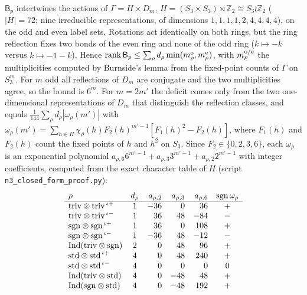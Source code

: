 \documentclass[aps,prx,reprint,superscriptaddress,nobibnotes,longbibliography]{revtex4-2}
\theoremstyle{remark}
\newcommand{\rk}{\operatorname{rank}}
\begin{document}
$\mathsf B_p$ intertwines the actions of $\Gamma=H\times D_m$, $H=(S_3\times S_3)\rtimes\mathbb Z_2\cong S_3\wr\mathbb Z_2$ ($|H|=72$; nine irreducible representations, of dimensions $1,1,1,1,2,4,4,4,4$), on the odd and even label sets.  Rotations act identically on both rings, but the ring reflection fixes two bonds of the even ring and none of the odd ring ($k\mapsto-k$ versus $k\mapsto-1-k$).  Hence $\rk\mathsf B_p\le\sum_\rho d_\rho\min(m_\rho^{\rm o},m_\rho^{\rm e})$, with $m^{\rm o/e}_\rho$ the multiplicities computed by Burnside's lemma from the fixed-point counts of $\Gamma$ on $S_3^m$.  For $m$ odd all reflections of $D_m$ are conjugate and the two multiplicities agree, so the bound is $6^m$.  For $m=2m'$ the deficit comes only from the two one-dimensional representations of $D_m$ that distinguish the reflection classes, and equals $\frac1{144}\sum_\rho d_\rho|\omega_\rho(m')|$ with $\omega_\rho(m')=\sum_{h\in H}\chi_\rho(h)F_2(h)^{m'-1}[F_1(h)^2-F_2(h)]$, where $F_1(h)$ and $F_2(h)$ count the fixed points of $h$ and $h^2$ on $S_3$.  Since $F_2\in\{0,2,3,6\}$, each $\omega_\rho$ is an exponential polynomial $a_{\rho,6}6^{m'-1}+a_{\rho,3}3^{m'-1}+a_{\rho,2}2^{m'-1}$ with integer coefficients, computed from the exact character table of $H$ (script \texttt{n3\_closed\_form\_proof.py}):
\begin{equation*}
\begin{array}{lcrrrc}
\rho & d_\rho & a_{\rho,2} & a_{\rho,3} & a_{\rho,6} & \operatorname{sgn}\omega_\rho\\ \hline
{\rm triv}\otimes{\rm triv}^{\,\iota+} & 1 & -36 & 0 & 36 & +\\
{\rm triv}\otimes{\rm triv}^{\,\iota-} & 1 & 36 & 48 & -84 & -\\
{\rm sgn}\otimes{\rm sgn}^{\,\iota+} & 1 & 36 & 0 & 108 & +\\
{\rm sgn}\otimes{\rm sgn}^{\,\iota-} & 1 & -36 & 48 & -12 & -\\
{\rm Ind}({\rm triv}\otimes{\rm sgn}) & 2 & 0 & 48 & 96 & +\\
{\rm std}\otimes{\rm std}^{\,\iota+} & 4 & 0 & 48 & 240 & +\\
{\rm std}\otimes{\rm std}^{\,\iota-} & 4 & 0 & 0 & 0 & 0\\
{\rm Ind}({\rm triv}\otimes{\rm std}) & 4 & 0 & -48 & 48 & +\\
{\rm Ind}({\rm sgn}\otimes{\rm std}) & 4 & 0 & -48 & 192 & +
\end{array}
\end{equation*}
\end{document}
